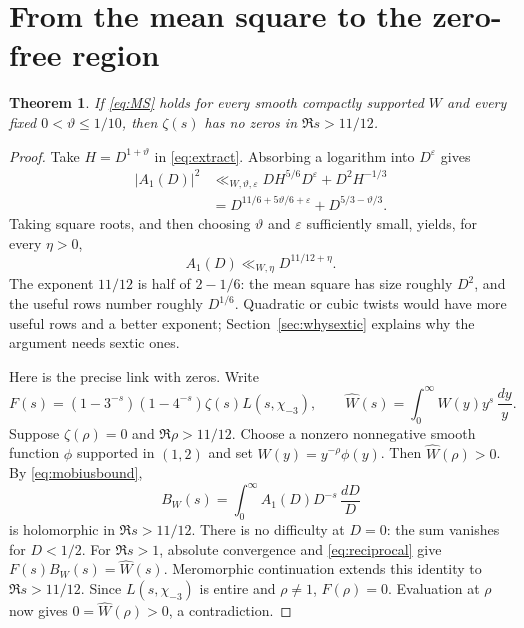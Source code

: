 \documentclass[11pt]{article}
\newcommand{\ch}{\chi_{-3}}
\numberwithin{equation}{section}
\newtheorem{theorem}{Theorem}
\begin{document}
\section{From the mean square to the zero-free region}\label{sec:zeros}

\begin{theorem}
If \eqref{eq:MS} holds for every smooth compactly supported $W$ and every
fixed $0<\vartheta\le1/10$, then $\zeta(s)$ has no zeros in $\Re s>11/12$.
\end{theorem}
\begin{proof}
Take $H=D^{1+\vartheta}$ in \eqref{eq:extract}. Absorbing a logarithm into
$D^\varepsilon$ gives
\begin{align}
 |A_1(D)|^2
 &\ll_{W,\vartheta,\varepsilon}DH^{5/6}D^\varepsilon+D^2H^{-1/3}\label{eq:A1square}\\
 &=D^{11/6+5\vartheta/6+\varepsilon}
   +D^{5/3-\vartheta/3}.\label{eq:A1exponents}
\end{align}
Taking square roots, and then choosing $\vartheta$ and $\varepsilon$
sufficiently small, yields, for every $\eta>0$,
\begin{equation}\label{eq:mobiusbound}
 A_1(D)\ll_{W,\eta}D^{11/12+\eta}.
\end{equation}
The exponent $11/12$ is half of $2-1/6$: the mean square has size roughly
$D^2$, and the useful rows number roughly $D^{1/6}$. Quadratic or cubic twists would have more
useful rows and a better exponent; Section~\ref{sec:whysextic} explains why the argument needs
sextic ones.

Here is the precise link with zeros. Write
\begin{equation}\label{eq:Fdef}
 F(s)=(1-3^{-s})(1-4^{-s})\zeta(s)L(s,\ch),\qquad
 \widehat W(s)=\int_0^\infty W(y)y^s\,\frac{dy}{y}.
\end{equation}
Suppose $\zeta(\rho)=0$ and $\Re\rho>11/12$. Choose a nonzero
nonnegative smooth function $\phi$ supported in $(1,2)$ and set
$W(y)=y^{-\rho}\phi(y)$. Then $\widehat W(\rho)>0$.
By \eqref{eq:mobiusbound},
\begin{equation}\label{eq:BW}
 B_W(s)=\int_0^\infty A_1(D)D^{-s}\,\frac{dD}{D}
\end{equation}
is holomorphic in $\Re s>11/12$. There is no difficulty at $D=0$:
the sum vanishes for $D<1/2$. For $\Re s>1$, absolute convergence and
\eqref{eq:reciprocal} give $F(s)B_W(s)=\widehat W(s)$.
Meromorphic continuation extends this identity to $\Re s>11/12$.
Since $L(s,\ch)$ is entire and $\rho\ne1$, $F(\rho)=0$.
Evaluation at $\rho$ now gives $0=\widehat W(\rho)>0$, a contradiction.
\end{proof}
\end{document}
